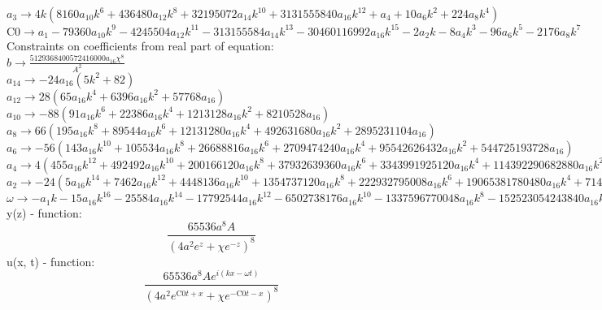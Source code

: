 \documentclass[12pt,a4paper,draft]{article}
\begin{document}
$a_{3}\to 4 k \left(8160 a_{10} k^6+436480 a_{12} k^8+32195072 a_{14} k^{10}+3131555840 a_{16} k^{12}+a_{4}+10 a_{6} k^2+224 a_{8} k^4\right)$\\
$\text{C0}\to a_{1}-79360 a_{10} k^9-4245504 a_{12} k^{11}-313155584 a_{14} k^{13}-30460116992 a_{16} k^{15}-2 a_{2} k-8 a_{4} k^3-96 a_{6} k^5-2176 a_{8} k^7$\\
Constraints on coefficients from real part of equation:
\\$b\to \frac{5129368400572416000 a_{16} \chi ^8}{A^2}$\\
$a_{14}\to -24 a_{16} \left(5 k^2+82\right)$\\
$a_{12}\to 28 \left(65 a_{16} k^4+6396 a_{16} k^2+57768 a_{16}\right)$\\
$a_{10}\to -88 \left(91 a_{16} k^6+22386 a_{16} k^4+1213128 a_{16} k^2+8210528 a_{16}\right)$\\
$a_{8}\to 66 \left(195 a_{16} k^8+89544 a_{16} k^6+12131280 a_{16} k^4+492631680 a_{16} k^2+2895231104 a_{16}\right)$\\
$a_{6}\to -56 \left(143 a_{16} k^{10}+105534 a_{16} k^8+26688816 a_{16} k^6+2709474240 a_{16} k^4+95542626432 a_{16} k^2+544725193728 a_{16}\right)$\\
$a_{4}\to 4 \left(455 a_{16} k^{12}+492492 a_{16} k^{10}+200166120 a_{16} k^8+37932639360 a_{16} k^6+3343991925120 a_{16} k^4+114392290682880 a_{16} k^2+714245133451264 a_{16}\right)$\\
$a_{2}\to -24 \left(5 a_{16} k^{14}+7462 a_{16} k^{12}+4448136 a_{16} k^{10}+1354737120 a_{16} k^8+222932795008 a_{16} k^6+19065381780480 a_{16} k^4+714245133451264 a_{16} k^2+5949902487552000 a_{16}\right)$\\
$\omega \to -a_{1} k-15 a_{16} k^{16}-25584 a_{16} k^{14}-17792544 a_{16} k^{12}-6502738176 a_{16} k^{10}-1337596770048 a_{16} k^8-152523054243840 a_{16} k^6-8570941601415168 a_{16} k^4-142797659701248000 a_{16} k^2+2900606834442240000 a_{16}$\\


y(z) - function:
$$
\frac{65536 a^8 A}{\left(4 a^2 e^z+\chi  e^{-z}\right)^8}
$$
u(x, t) - function:
$$
\frac{65536 a^8 A e^{i (k x-\omega  t)}}{\left(4 a^2 e^{\text{C0} t+x}+\chi  e^{-\text{C0} t-x}\right)^8}
$$
\end{document}
